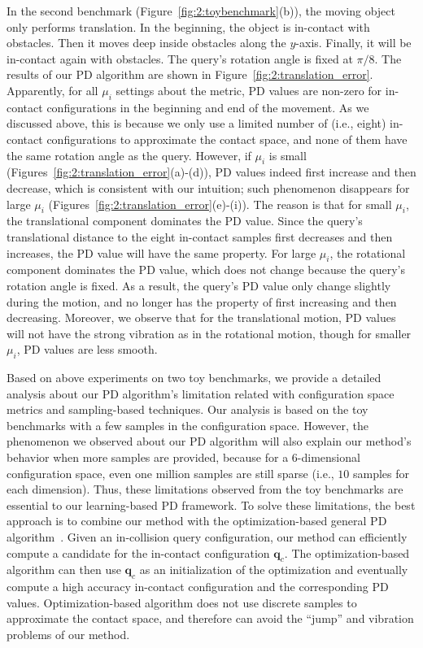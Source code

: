 In the second benchmark (Figure~\ref{fig:2:toybenchmark}(b)), the moving object only performs translation. In the beginning, the object is in-contact with obstacles. Then it moves deep inside obstacles along the $y$-axis. Finally, it will be in-contact again with obstacles. The query's rotation angle is fixed at $\pi/8$. The results of our PD algorithm are shown in Figure~\ref{fig:2:translation_error}. Apparently, for all $\mu_i$ settings about the metric, PD values are non-zero for in-contact configurations in the beginning and end of the movement. As we discussed above, this is because
we only use a limited number of (i.e., eight) in-contact configurations to approximate the contact space, and none of them have the same rotation angle as the query. However, if $\mu_i$ is small (Figures~\ref{fig:2:translation_error}(a)-(d)), PD values indeed first increase and then decrease, which is consistent with our intuition; such phenomenon disappears for large $\mu_i$ (Figures~\ref{fig:2:translation_error}(e)-(i)). The reason is that for small $\mu_i$, the translational component dominates the PD value. Since the query's translational distance to the eight in-contact samples first decreases and then increases, the PD value will have the same property. For large $\mu_i$, the rotational component dominates the PD value, which does not change because the query's rotation angle is fixed. As a result, the query's PD value only change slightly during the motion, and no longer has the property of first increasing and then decreasing.  Moreover, we observe that for the translational motion, PD values will not have the strong vibration as in the rotational motion, though for smaller $\mu_i$, PD values are less smooth.

Based on above experiments on two toy benchmarks, we provide a detailed analysis about our PD algorithm's limitation related with configuration space metrics and sampling-based techniques. Our analysis is based on the toy benchmarks with a few samples in the configuration space. However, the phenomenon we observed about our PD algorithm will also explain our method's behavior when more samples are provided, because for a $6$-dimensional configuration space, even one million samples are still sparse (i.e., $10$ samples for each dimension). Thus, these limitations observed from the toy benchmarks are essential to our learning-based PD framework.
To solve these limitations, the best approach is to combine our method with the optimization-based general PD algorithm~\cite{Tang:IGP:2013}. Given an in-collision query configuration, our method can efficiently compute a candidate for the in-contact configuration $\mathbf q_c$. The optimization-based algorithm can then use $\mathbf q_c$ as an initialization of the optimization and eventually compute a high accuracy in-contact configuration and the corresponding PD values. Optimization-based algorithm does not use discrete samples to approximate the contact space, and therefore can avoid the ``jump'' and vibration problems of our method.


